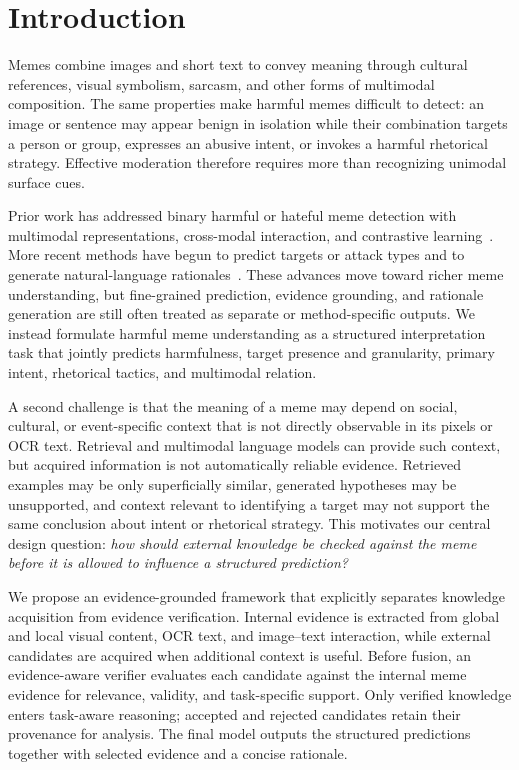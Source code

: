 \section{Introduction}
\label{sec:introduction}

Memes combine images and short text to convey meaning through cultural
references, visual symbolism, sarcasm, and other forms of multimodal
composition.  The same properties make harmful memes difficult to detect:
an image or sentence may appear benign in isolation while their combination
targets a person or group, expresses an abusive intent, or invokes a
harmful rhetorical strategy.  Effective moderation therefore requires more
than recognizing unimodal surface cues.

Prior work has addressed binary harmful or hateful meme detection with
multimodal representations, cross-modal interaction, and
contrastive learning~\cite{kiela2020hateful,kumar2022hateclipper,shah2024memeclip,mei2024rgcl}.
More recent methods have begun to predict targets or attack types and to
generate natural-language rationales~\cite{pramanick2021harmeme,sharma2022disarm,lin2024explainhm}.
These advances
move toward richer meme understanding, but fine-grained prediction,
evidence grounding, and rationale generation are still often treated as
separate or method-specific outputs.  We instead formulate harmful meme
understanding as a structured interpretation task that jointly predicts
harmfulness, target presence and granularity, primary intent, rhetorical
tactics, and multimodal relation.

A second challenge is that the meaning of a meme may depend on social,
cultural, or event-specific context that is not directly observable in its
pixels or OCR text.  Retrieval and multimodal language models can provide
such context, but acquired information is not automatically reliable
evidence.  Retrieved examples may be only superficially similar, generated
hypotheses may be unsupported, and context relevant to identifying a target
may not support the same conclusion about intent or rhetorical strategy.
This motivates our central design question: \emph{how should external
knowledge be checked against the meme before it is allowed to influence a
structured prediction?}

We propose an evidence-grounded framework that explicitly separates
knowledge acquisition from evidence verification.  Internal evidence is
extracted from global and local visual content, OCR text, and image--text
interaction, while external candidates are acquired when additional context
is useful.  Before fusion, an evidence-aware verifier evaluates each
candidate against the internal meme evidence for relevance, validity, and
task-specific support.  Only verified knowledge enters task-aware
reasoning; accepted and rejected candidates retain their provenance for
analysis.  The final model outputs the structured predictions together with
selected evidence and a concise rationale.

